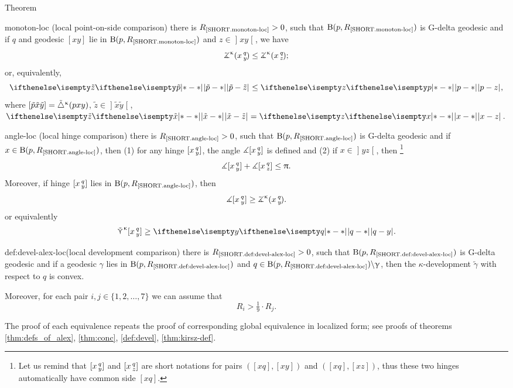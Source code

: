 \begin{thm}{Theorem}
\begin{subthmN}{monoton-loc} (local point-on-side comparison) 
there is $R_{\hbox{\rm\scriptsize\ref{SHORT.monoton-loc}}}>0$, 
such that $\mathrm{B}{}(p,R_{\hbox{\rm\scriptsize\ref{SHORT.monoton-loc}}})$ is G-delta geodesic and if $q$ and geodesic $[x y]$ lie in $\mathrm{B}{}(p,R_{\hbox{\rm\scriptsize\ref{SHORT.monoton-loc}}})$ 
and $z\in \mathopen{]}x y\mathclose{[}$, we have
\[\angk\kappa x q y
\le\angk\kappa x q z;\]
or, equivalently, 
\[\dist{\tilde p}{\tilde z}{}\le \dist{p}{z}{},\]
where $[{\tilde p}{\tilde x}{\tilde y}]={\tilde\triangle}^{\upkappa}(p x y)$, $\tilde z\in\mathopen{]} \tilde x\tilde y\mathclose{[}$, $\dist{\tilde x}{\tilde z}{}=\dist{x}{z}{}$.
\end{subthmN}

\begin{subthmN}{angle-loc} (local hinge comparison) 
there is $R_{\hbox{\rm\scriptsize\ref{SHORT.angle-loc}}}>0$, such that $\mathrm{B}{}(p,R_{\hbox{\rm\scriptsize\ref{SHORT.angle-loc}}})$ is G-delta geodesic and if $x\in \oBall(p,R_{\hbox{\rm\scriptsize\ref{SHORT.angle-loc}}})$, then (1) for any hinge $[x\,{}^{q}_{y}]$, the angle 
$\measuredangle[x\,{}^{q}_{y}]$ is defined and (2) if $x\in \mathopen{]}y z\mathclose{[}$, then%
\footnote{Let us remind that $[x\,{}^{q}_{y}]$ and $[x\,{}^{q}_{z}]$  are short notations for pairs $([x q],[x y])$ and $([x q],[x z])$, 
thus these two hinges automatically have common side $[x q]$.}
\[\mangle\hinge x q y+ \mangle\hinge x q z\le\pi.\]
Moreover, if hinge $[x\,{}^{q}_{y}]$ lies in $\mathrm{B}{}(p,R_{\hbox{\rm\scriptsize\ref{SHORT.angle-loc}}})$, then 
\[\mangle\hinge x q y
\ge\angk\kappa x q y.\]
or equivalently
\[\side\kappa \hinge x q y\ge\dist{q}{ y}{}.\]
\end{subthmN}


\begin{subthmN}{def:devel-alex-loc}(local development comparison) 
there is $R_{\hbox{\rm\scriptsize\ref{SHORT.def:devel-alex-loc}}}>0$, 
such that $\mathrm{B}{}(p,R_{\hbox{\rm\scriptsize\ref{SHORT.def:devel-alex-loc}}})$ 
is G-delta geodesic and if a geodesic $\gamma$ lies in $\mathrm{B}{}(p,R_{\hbox{\rm\scriptsize\ref{SHORT.def:devel-alex-loc}}})$ and $q\in 
\oBall(p,R_{\hbox{\rm\scriptsize\ref{SHORT.def:devel-alex-loc}}})
\backslash \gamma$, then the $\kappa$-development $\tilde \gamma$ with respect to $q$ is convex.
\end{subthmN}
Moreover, for each pair $i,j\in \{1,2,\dots,7\}$ we can assume that 
\[R_i>\tfrac{1}{9}\cdot R_j.\]
\end{thm}

The proof of each equivalence repeats the proof of corresponding global equivalence in localized form; see proofs of theorems \ref{thm:defs_of_alex}, \ref{thm:conc}, \ref{def:devel}, \ref{thm:kirsz-def}.


